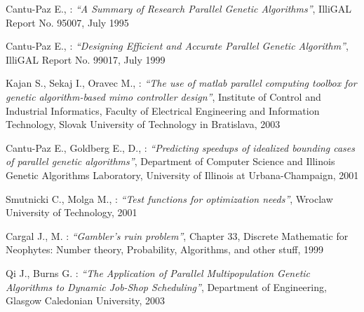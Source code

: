 \begin{thebibliography}{99}
	Cantu-Paz E., : \textit{``A Summary of Research Parallel Genetic
	Algorithms''}, IlliGAL Report No. 95007, July 1995

	Cantu-Paz E., : \textit{``Designing Efficient and Accurate Parallel Genetic
	Algorithm''}, IlliGAL Report No. 99017, July 1999

	Kajan S., Sekaj I., Oravec M., : \textit{``The use of matlab parallel
	computing toolbox for genetic algorithm-based mimo controller design''},
	Institute of Control and Industrial Informatics,
    Faculty of Electrical Engineering and Information Technology, 
	Slovak University of Technology in Bratislava, 2003

	Cantu-Paz E., Goldberg E., D., : \textit{``Predicting speedups of idealized
	bounding cases of parallel genetic algorithms''},
	Department of Computer Science and Illinois Genetic Algorithms Laboratory, 
	University of Illinois at Urbana-Champaign, 2001

	Smutnicki C., Molga M., : \textit{``Test functions for optimization needs''},
	Wroclaw University of Technology, 2001

	Cargal J., M. : \textit{``Gambler's ruin problem''},
	Chapter 33, Discrete Mathematic for Neophytes: Number theory, Probability,
	Algorithms, and other stuff, 1999

	Qi J., Burns G. : \textit{``The Application of Parallel Multipopulation
	Genetic Algorithms to Dynamic Job-Shop Scheduling''},
	Department of Engineering, Glasgow Caledonian University, 2003

\end{thebibliography}


\newpage

\listoffigures

\listoftables

